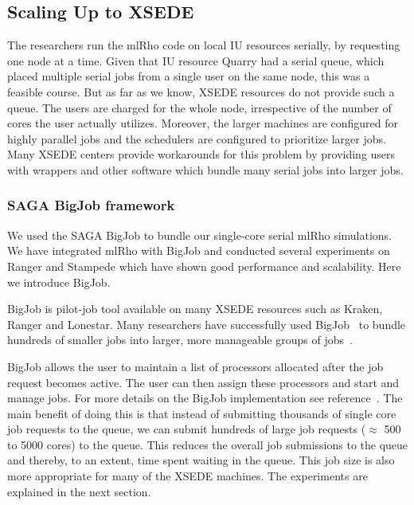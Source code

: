 \documentclass{sig-alternate}
\begin{document}
\subsection{Scaling Up to XSEDE}
\label{sec:tests}

The researchers run the mlRho code on local IU resources serially, by requesting one node at a time. Given that IU resource Quarry had a serial queue, which placed multiple serial jobs from a single user on the same node, this was a feasible course. But as far as we know, XSEDE resources do not provide such a queue. The users are charged for the whole node, irrespective of the number of cores the user actually utilizes. Moreover, the larger machines are configured for highly parallel jobs and the schedulers are configured to prioritize larger jobs. Many XSEDE centers provide workarounds for this problem by providing users with wrappers and other software which bundle many serial jobs into larger jobs. 


\subsubsection{SAGA BigJob framework}
\label{sec:bigjob}

We used the SAGA BigJob to bundle our single-core serial mlRho simulations. We have integrated mlRho with BigJob and conducted several experiments on Ranger and Stampede which have shown good performance and scalability. Here we introduce BigJob.

BigJob is pilot-job tool available on many XSEDE resources such as Kraken, Ranger and Lonestar. Many researchers have successfully used BigJob~\cite{bigjob_web} to bundle hundreds of smaller jobs into larger, more manageable groups of jobs~\cite{Luckow:2008fp, async_repex11}. 

BigJob allows the user to maintain a list of processors allocated after the job request becomes active. The user can then assign these processors and start and manage jobs. For more details on the BigJob implementation see reference~\cite{saga_bigjob_condor_cloud}. The main benefit of doing this is that instead of submitting thousands of single core job requests to the queue, we can submit hundreds of large job requests ($\approx$ 500 to 5000 cores) to the queue. This reduces the overall job submissions to the queue and thereby, to an extent, time spent waiting in the queue. This job size is also more appropriate for many of the XSEDE machines. The experiments are explained in the next section. 
\end{document}
